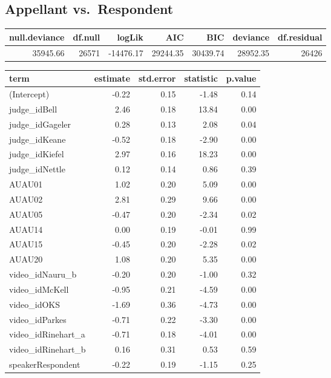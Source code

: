 \documentclass{monashthesis}
\begin{document}
\hypertarget{appellant-vs.respondent}{%
\subsection{Appellant vs.~Respondent}\label{appellant-vs.respondent}}

\begin{tabular}{r|r|r|r|r|r|r}
\hline
null.deviance & df.null & logLik & AIC & BIC & deviance & df.residual\\
\hline
35945.66 & 26571 & -14476.17 & 29244.35 & 30439.74 & 28952.35 & 26426\\
\hline
\end{tabular}

\begin{tabular}{l|r|r|r|r}
\hline
term & estimate & std.error & statistic & p.value\\
\hline
(Intercept) & -0.22 & 0.15 & -1.48 & 0.14\\
\hline
judge\_idBell & 2.46 & 0.18 & 13.84 & 0.00\\
\hline
judge\_idGageler & 0.28 & 0.13 & 2.08 & 0.04\\
\hline
judge\_idKeane & -0.52 & 0.18 & -2.90 & 0.00\\
\hline
judge\_idKiefel & 2.97 & 0.16 & 18.23 & 0.00\\
\hline
judge\_idNettle & 0.12 & 0.14 & 0.86 & 0.39\\
\hline
AUAU01 & 1.02 & 0.20 & 5.09 & 0.00\\
\hline
AUAU02 & 2.81 & 0.29 & 9.66 & 0.00\\
\hline
AUAU05 & -0.47 & 0.20 & -2.34 & 0.02\\
\hline
AUAU14 & 0.00 & 0.19 & -0.01 & 0.99\\
\hline
AUAU15 & -0.45 & 0.20 & -2.28 & 0.02\\
\hline
AUAU20 & 1.08 & 0.20 & 5.35 & 0.00\\
\hline
video\_idNauru\_b & -0.20 & 0.20 & -1.00 & 0.32\\
\hline
video\_idMcKell & -0.95 & 0.21 & -4.59 & 0.00\\
\hline
video\_idOKS & -1.69 & 0.36 & -4.73 & 0.00\\
\hline
video\_idParkes & -0.71 & 0.22 & -3.30 & 0.00\\
\hline
video\_idRinehart\_a & -0.71 & 0.18 & -4.01 & 0.00\\
\hline
video\_idRinehart\_b & 0.16 & 0.31 & 0.53 & 0.59\\
\hline
speakerRespondent & -0.22 & 0.19 & -1.15 & 0.25\\

\end{tabular}
\end{document}
